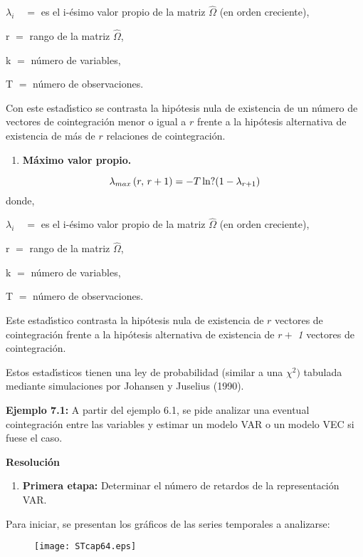 $\lambda_{i}\quad =$ es el i-\'{e}simo valor propio de la matriz $\hat{\Omega 
}$ (en orden creciente),

r $=$ rango de la matriz $\hat{\Omega }$,

k $=$ n\'{u}mero de variables,

T $=$ n\'{u}mero de observaciones.

Con este estad\'{\i}stico se contrasta la hip\'{o}tesis nula de existencia 
de un n\'{u}mero de vectores de cointegraci\'{o}n menor o igual a $r$ frente a 
la hip\'{o}tesis alternativa de existencia de m\'{a}s de $r$ relaciones de 
cointegraci\'{o}n.

\begin{enumerate}
\item \textbf{M\'{a}ximo valor propio.}
\end{enumerate}
\[
\lambda_{max}\left( r,\thinspace r+1 \right)=-T\thinspace 
\mathrm{ln?}(1-\lambda_{r+1})
\]
donde,

$\lambda_{i}\quad =$ es el i-\'{e}simo valor propio de la matriz $\hat{\Omega 
}$ (en orden creciente),

r $=$ rango de la matriz $\hat{\Omega }$,

k $=$ n\'{u}mero de variables,

T $=$ n\'{u}mero de observaciones.

Este estad\'{\i}stico contrasta la hip\'{o}tesis nula de existencia de $r$ 
vectores de cointegraci\'{o}n frente a la hip\'{o}tesis alternativa de 
existencia de $r +$\textit{ 1} vectores de cointegraci\'{o}n.

Estos estad\'{\i}sticos tienen una ley de probabilidad (similar a una $\chi 
^{2})$ tabulada mediante simulaciones por Johansen y Juselius (1990).

\textbf{Ejemplo 7.1:} A partir del ejemplo 6.1, se pide analizar una 
eventual cointegraci\'{o}n entre las variables y estimar un modelo VAR o un 
modelo VEC si fuese el caso.

\textbf{Resoluci\'{o}n}

\begin{enumerate}
\item \textbf{Primera etapa: }Determinar el n\'{u}mero de retardos de la representaci\'{o}n VAR.
\end{enumerate}

Para iniciar, se presentan los gr\'{a}ficos de las series temporales a 
analizarse:

\begin{figure}[H]
\texttt{[image: STcap64.eps]}
\label{fig4}
\end{figure}

